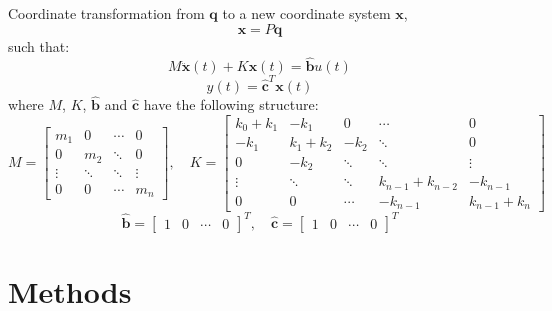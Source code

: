 \documentclass{beamer}
\begin{document}
\begin{frame}
Coordinate transformation from $\mathbf{q}$ to a new coordinate system $\mathbf{x}$,
\begin{equation}
\mathbf{x} = P \mathbf{q}
\label{eq:transform}
\end{equation}
such that:
\begin{equation}
M\ddot{\mathbf{x}}(t) + K\mathbf{x}(t) = \mathbf{\hat{b}}u(t)
\label{eq:ms1}
\end{equation}
\begin{equation}
y(t) = \mathbf{\hat{c}}^T \mathbf{x}(t)
\label{eq:ms2}
\end{equation}
where $M$, $K$, $\mathbf{\hat{b}}$ and $\mathbf{\hat{c}}$ have the following structure:
\footnotesize{
$$
M = \begin{bmatrix}
m_1  &  0 & \cdots & 0 \\
0 & m_2  & \ddots & 0 \\
\vdots & \ddots & \ddots & \vdots \\
0 & 0 & \cdots & m_n \end{bmatrix}
, \quad
K = \begin{bmatrix}
k_0+k_1  &  -k_1 & 0 & \cdots & 0 \\
-k_1 & k_1+k_2  & -k_2 & \ddots & 0 \\
0 & -k_2 & \ddots & \ddots & \vdots \\
\vdots & \ddots & \ddots & k_{n-1}+k_{n-2} & -k_{n-1} \\
0 & 0 & \cdots & -k_{n-1} &  k_{n-1} + k_n \end{bmatrix}
$$
$$
\mathbf{\hat{b}} = \begin{bmatrix} 1 & 0 & \cdots & 0 \end{bmatrix}^T
,\quad \mathbf{\hat{c}} = \begin{bmatrix} 1 & 0 & \cdots & 0 \end{bmatrix}^T
\label{eq:ms3}
$$
}
\end{frame}

\section{Methods}
\end{document}
